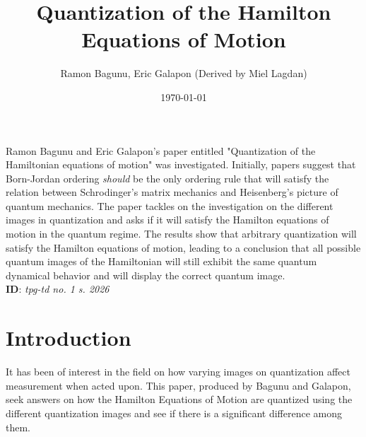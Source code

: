 \documentclass[a4paper]{article}
\title{\textbf{Quantization of the Hamilton Equations of Motion} \cite{Bagunu2025}}
\author{Ramon Bagunu, Eric Galapon (Derived by Miel Lagdan)}
\date{\today}
\theoremstyle{definition}
\begin{document}
	\maketitle
	\noindent Ramon Bagunu and Eric Galapon's paper entitled "Quantization of the Hamiltonian equations of motion" was investigated. Initially, papers suggest that Born-Jordan ordering \textit{should} be the only ordering rule that will satisfy the relation between Schrodinger's matrix mechanics and Heisenberg's picture of quantum mechanics. The paper tackles on the investigation on the different images in quantization and asks if it will satisfy the Hamilton equations of motion in the quantum regime. The results show that arbitrary quantization will satisfy the Hamilton equations of motion, leading to a conclusion that all possible quantum images of the Hamiltonian will still exhibit the same quantum dynamical behavior and will display the correct quantum image. \\
	
	\textbf{ID}: \textit{tpg-td no. 1 s. 2026}
	
	\tableofcontents

\section{Introduction}
It has been of interest in the field on how varying images on quantization affect measurement when acted upon. This paper, produced by Bagunu and Galapon, seek answers on how the Hamilton Equations of Motion are quantized using the different quantization images and see if there is a significant difference among them.
\end{document}
